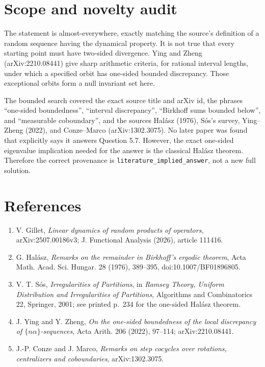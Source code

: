\documentclass[11pt]{article}
\begin{document}
\section{Scope and novelty audit}

The statement is almost-everywhere, exactly matching the source's definition
of a random sequence having the dynamical property.  It is not true that every
starting point must have two-sided divergence.  Ying and Zheng
(arXiv:2210.08441) give sharp arithmetic criteria, for rational interval
lengths, under which a specified orbit has one-sided bounded discrepancy.
Those exceptional orbits form a null invariant set here.

The bounded search covered the exact source title and arXiv id, the phrases
``one-sided boundedness'', ``interval discrepancy'', ``Birkhoff sums bounded
below'', and ``measurable coboundary'', and the sources Hal\'asz (1976), S\'os's
survey, Ying--Zheng (2022), and Conze--Marco (arXiv:1302.3075).  No later paper
was found that explicitly says it answers Question 5.7.  However, the exact
one-sided eigenvalue implication needed for the answer is the classical
Hal\'asz theorem.  Therefore the correct provenance is
\texttt{literature\_implied\_answer}, not a new full solution.

\section*{References}

{\scriptsize
\setlength{\emergencystretch}{1em}
\sloppy
\begin{enumerate}
\setlength{\itemsep}{0.15em}
\setlength{\parskip}{0pt}
\item V. Gillet, \emph{Linear dynamics of random products of operators},
  arXiv:2507.00186v3; J. Functional Analysis (2026), article 111416.
\item G. Hal\'asz, \emph{Remarks on the remainder in Birkhoff's ergodic
  theorem}, Acta Math. Acad. Sci. Hungar. 28 (1976), 389--395,
  doi:10.1007/BF01896805.
\item V. T. S\'os, \emph{Irregularities of Partitions}, in
  \emph{Ramsey Theory, Uniform Distribution and Irregularities of
  Partitions}, Algorithms and Combinatorics 22, Springer, 2001; see printed
  p.~234 for the one-sided Hal\'asz theorem.
\item J. Ying and Y. Zheng, \emph{On the one-sided boundedness of the local
  discrepancy of $\{n\alpha\}$-sequences}, Acta Arith. 206 (2022), 97--114;
  arXiv:2210.08441.
\item J.-P. Conze and J. Marco, \emph{Remarks on step cocycles over rotations,
  centralizers and coboundaries}, arXiv:1302.3075.
\end{enumerate}
}
\end{document}
